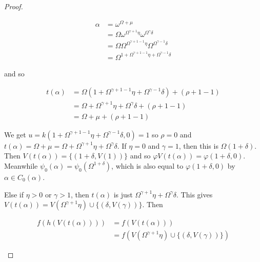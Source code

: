 \documentclass{article}
\theoremstyle{definition}
\theoremstyle{plain}
\theoremstyle{plain}
\theoremstyle{plain}
\theoremstyle{plain}
\theoremstyle{remark}
\theoremstyle{remark}
\theoremstyle{remark}
\theoremstyle{plain}
\theoremstyle{plain}
\begin{document}
\begin{proof}
\begin{enumerate}
\begin{enumerate}
\begin{enumerate}
\begin{enumerate}
                \begin{equation}
                \begin{split}
                \alpha & = \omega^{\Omega+\mu} \\ & = \Omega \omega^{\Omega^{\gamma+1} \eta} \omega^{\Omega^\gamma \delta} \\ & = \Omega \Omega^{\Omega^{\gamma+1-1} \eta} \Omega^{\Omega^{\gamma-1} \delta} \\ & = \Omega^{1 + \Omega^{\gamma+1-1} \eta + \Omega^{\gamma-1} \delta}
                \end{split}
                \end{equation}

                and so

                \begin{equation}
                \begin{split}
                t(\alpha) & = \Omega (1 + \Omega^{\gamma+1-1} \eta + \Omega^{\gamma-1} \delta) + (\rho+1 - 1) \\ & = \Omega + \Omega^{\gamma+1} \eta + \Omega^\gamma \delta + (\rho+1 - 1) \\ & = \Omega + \mu + (\rho+1 - 1)
                \end{split}
                \end{equation}

                We get $u = k(1 + \Omega^{\gamma+1-1} \eta + \Omega^{\gamma-1} \delta, 0) = 1$ so $\rho = 0$ and $t(\alpha) = \Omega + \mu = \Omega + \Omega^{\gamma+1} \eta + \Omega^\gamma \delta$. If $\eta = 0$ and $\gamma = 1$, then this is $\Omega (1 + \delta)$. Then $V(t(\alpha)) = \{(1+\delta, V(1))\}$ and so $\varphi V(t(\alpha)) = \varphi(1+\delta, 0)$. Meanwhile $\psi_0(\alpha) = \psi_0(\Omega^{1 + \delta})$, which is also equal to $\varphi(1+\delta, 0)$ by $\alpha \in C_0(\alpha)$.
                
                Else if $\eta > 0$ or $\gamma > 1$, then $t(\alpha)$ is just $\Omega^{\gamma+1} \eta + \Omega^\gamma \delta$. This gives $V(t(\alpha)) = V(\Omega^{\gamma+1} \eta) \cup \{(\delta, V(\gamma))\}$. Then

                \begin{equation}
                \begin{split}
                f(h(V(t(\alpha)))) & = f(V(t(\alpha))) \\ & = f(V(\Omega^{\gamma+1} \eta) \cup \{(\delta, V(\gamma))\})
                \end{split}
                \end{equation}


\end{enumerate}
\end{enumerate}
\end{enumerate}
\end{enumerate}
\end{proof}
\end{document}
